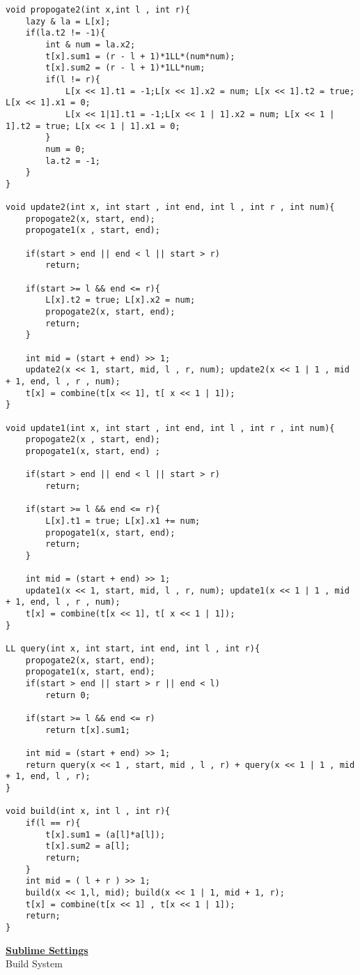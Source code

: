 \documentclass[10pt,a4paper]{report}
\begin{document}
\begin{landscape}
\begin{multicols}{2}
\begin{verbatim}
void propogate2(int x,int l , int r){
	lazy & la = L[x]; 
	if(la.t2 != -1){
		int & num = la.x2; 
		t[x].sum1 = (r - l + 1)*1LL*(num*num); 
		t[x].sum2 = (r - l + 1)*1LL*num; 
		if(l != r){
			L[x << 1].t1 = -1;L[x << 1].x2 = num; L[x << 1].t2 = true; L[x << 1].x1 = 0;  
			L[x << 1|1].t1 = -1;L[x << 1 | 1].x2 = num; L[x << 1 | 1].t2 = true; L[x << 1 | 1].x1 = 0; 
		}
		num = 0; 
		la.t2 = -1; 
	}
}

void update2(int x, int start , int end, int l , int r , int num){
	propogate2(x, start, end); 
	propogate1(x , start, end); 

	if(start > end || end < l || start > r)
		return; 

	if(start >= l && end <= r){ 
		L[x].t2 = true; L[x].x2 = num;
		propogate2(x, start, end);  
		return; 
	}

	int mid = (start + end) >> 1; 
	update2(x << 1, start, mid, l , r, num); update2(x << 1 | 1 , mid + 1, end, l , r , num); 
	t[x] = combine(t[x << 1], t[ x << 1 | 1]); 
}

void update1(int x, int start , int end, int l , int r , int num){
	propogate2(x , start, end); 
	propogate1(x, start, end) ; 

	if(start > end || end < l || start > r)
		return; 

	if(start >= l && end <= r){ 
		L[x].t1 = true; L[x].x1 += num; 
		propogate1(x, start, end); 
		return; 
	}

	int mid = (start + end) >> 1; 
	update1(x << 1, start, mid, l , r, num); update1(x << 1 | 1 , mid + 1, end, l , r , num); 
	t[x] = combine(t[x << 1], t[ x << 1 | 1]); 
}

LL query(int x, int start, int end, int l , int r){
	propogate2(x, start, end); 
	propogate1(x, start, end); 
	if(start > end || start > r || end < l)
		return 0; 

	if(start >= l && end <= r)
		return t[x].sum1; 

	int mid = (start + end) >> 1; 
	return query(x << 1 , start, mid , l , r) + query(x << 1 | 1 , mid + 1, end, l , r); 
}

void build(int x, int l , int r){
	if(l == r){
		t[x].sum1 = (a[l]*a[l]); 
		t[x].sum2 = a[l]; 
		return; 
	}
	int mid = ( l + r ) >> 1; 
	build(x << 1,l, mid); build(x << 1 | 1, mid + 1, r); 
	t[x] = combine(t[x << 1] , t[x << 1 | 1]); 
	return; 
}
\end{verbatim}


\begin{flushleft}
\textbf{\underline{Sublime Settings}}\\
Build System
\end{flushleft}


\end{multicols}
\end{landscape}
\end{document}
